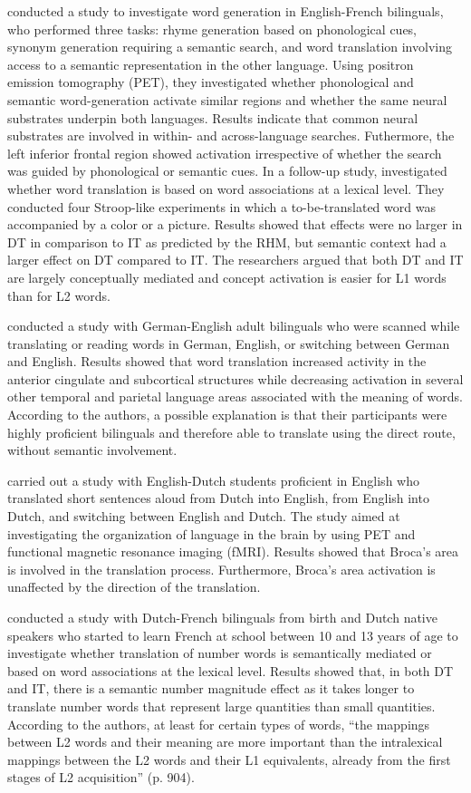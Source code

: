 \documentclass[output=paper]{langscibook}
\begin{document}
\citet{klein1995neural} conducted a study to investigate word generation in English-French bilinguals, who performed three tasks: rhyme generation based on phonological cues, synonym generation requiring a semantic search, and word translation involving access to a semantic representation in the other language. Using positron emission tomography (PET), they investigated whether phonological and semantic word-generation activate similar regions and whether the same neural substrates underpin both languages. Results indicate that common neural substrates are involved in within- and across-language searches. Futhermore, the left inferior frontal region showed activation irrespective of whether the search was guided by phonological or semantic cues. In a follow-up study, \citet{la1996nonverbal} investigated whether word translation is based on word associations at a lexical level. They conducted four Stroop-like experiments in which a to-be-translated word was accompanied by a color or a picture. Results showed that effects were no larger in DT in comparison to IT as predicted by the RHM, but semantic context had a larger effect on DT compared to IT. The researchers argued that both DT and IT are largely conceptually mediated and concept activation is easier for L1 words than for L2 words.

\citet{price1999functional} conducted a study with German-English adult bilinguals who were scanned while translating or reading words in German, English, or switching between German and English. Results showed that word translation increased activity in the anterior cingulate and subcortical structures while decreasing activation in several other temporal and parietal language areas associated with the meaning of words. According to the authors, a possible explanation is that their participants were highly proficient bilinguals and therefore able to translate using the direct route, without semantic involvement.

\citet{quaresima2002lateral} carried out a study with English-Dutch students proficient in English who translated short sentences aloud from Dutch into English, from English into Dutch, and switching between English and Dutch. The study aimed at investigating the organization of language in the brain by using PET and functional magnetic resonance imaging (fMRI). Results showed that Broca’s area is involved in the translation process. Furthermore, Broca’s area activation is unaffected by the direction of the translation. 

\citet{duyck2004forward} conducted a study with Dutch-French bilinguals from birth and Dutch native speakers who started to learn French at school between 10 and 13 years of age to investigate whether translation of number words is semantically mediated or based on word associations at the lexical level. Results showed that, in both DT and IT, there is a semantic number magnitude effect as it takes longer to translate number words that represent large quantities than small quantities. According to the authors, at least for certain types of words, “the mappings between L2 words and their meaning are more important than the intralexical mappings between the L2 words and their L1 equivalents, already from the first stages of L2 acquisition” (p. 904).
\end{document}

